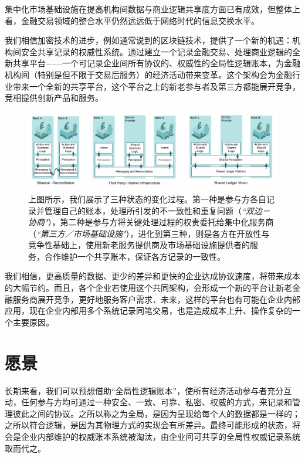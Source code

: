 \documentclass[UTF8]{ctexart}
\begin{document}
集中化市场基础设施在提高机构间数据与商业逻辑共享度方面已有成效，但整体上看，金融交易领域的整合水平仍然远远低于网络时代的信息交换水平。\cite{IT}

我们相信加密技术的进步，例如通常说到的区块链技术，提供了一个新的机遇：机构间安全共享记录的权威性系统。通过建立一个记录金融交易、处理商业逻辑的全新共享平台——一个可记录企业间所有协议的、权威性的全局性逻辑账本，为金融机构间（特别是但不限于交易后服务）的经济活动带来变革。这个架构会为金融行业带来一个全新的共享平台，这个平台之上的新老参与者及第三方都能展开竞争，竞相提供创新产品和服务。 

\begin{figure}[H]
\includegraphics[scale=.5, center]{sharedlogic} 
\caption{上图所示，我们展示了三种状态的变化过程。第一种是参与方各自记录并管理自己的账本，处理所引发的不一致性和重复问题（\textit{``双边－协商"}），第二种是参与方将关键处理过程的权责委托给集中化服务商（\textit{``第三方／市场基础设施"}），进化到第三种，则是各方在开放性与竞争性基础上，使用新老服务提供商及市场基础设施提供者的服	务，合作维护一个共享账本，保证各方记录的一致性。}
\end{figure}


我们相信，更高质量的数据、更少的差异和更快的企业达成协议速度，将带来成本的大幅节约。而且，各个企业若使用这个共同架构，会形成一个新的平台让新老金融服务商展开竞争，更好地服务客户需求．未来，这样的平台也有可能在企业内部应用，现在企业内部用多个系统记录同笔交易，也是造成成本上升、操作复杂的一个主要原因。

\section{愿景}
长期来看，我们可以预想借助``全局性逻辑账本”，使所有经济活动参与者充分互动，任何参与方均可通过一种安全、一致、可靠、私密、权威的方式，来记录和管理彼此之间的协议。之所以称之为全局，是因为呈现给每个人的数据都是一样的；之所以符合逻辑，是因为其物理方式的实现会有所差异。最终可能形成的状态，将会是企业内部维护的权威账本系统被淘汰，由企业间可共享的全局性权威记录系统取而代之。 
\end{document}
